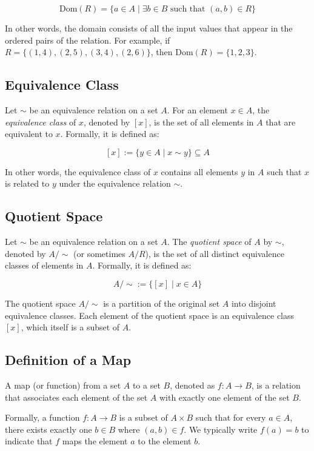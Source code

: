 \[
	\text{Dom}(R) = \{a \in A \mid \exists b \in B \text{ such that } (a,b) \in R\}
\]

In other words, the domain consists of all the input values that appear in the ordered pairs of the relation. For example, if \(R = \{(1,4), (2,5), (3,4), (2,6)\}\), then \(\text{Dom}(R) = \{1, 2, 3\}\).

\subsection{Equivalence Class}

Let \(\sim\) be an equivalence relation on a set \(A\). For an element \(x \in A\), the \emph{equivalence class} of \(x\), denoted by \([x]\), is the set of all elements in \(A\) that are equivalent to \(x\). Formally, it is defined as:

\[
	[x] := \{y \in A \mid x \sim y\} \subseteq A
\]

In other words, the equivalence class of \(x\) contains all elements \(y\) in \(A\) such that \(x\) is related to \(y\) under the equivalence relation \(\sim\).

\subsection{Quotient Space}

Let \(\sim\) be an equivalence relation on a set \(A\). The \emph{quotient space} of \(A\) by \(\sim\), denoted by \(A/\sim\) (or sometimes \(A/R\)), is the set of all distinct equivalence classes of elements in \(A\). Formally, it is defined as:

\[
	A/\sim := \{[x] \mid x \in A\}
\]

The quotient space \(A/\sim\) is a partition of the original set \(A\) into disjoint equivalence classes. Each element of the quotient space is an equivalence class \([x]\), which itself is a subset of \(A\).

\subsection{Definition of a Map}

A map (or function) from a set \(A\) to a set \(B\), denoted as \(f: A \to B\), is a relation that associates each element of the set \(A\) with exactly one element of the set \(B\).

Formally, a function \(f: A \to B\) is a subset of \(A \times B\) such that for every \(a \in A\), there exists exactly one \(b \in B\) where \((a,b) \in f\). We typically write \(f(a) = b\) to indicate that \(f\) maps the element \(a\) to the element \(b\).
\vspace{\baselineskip}

